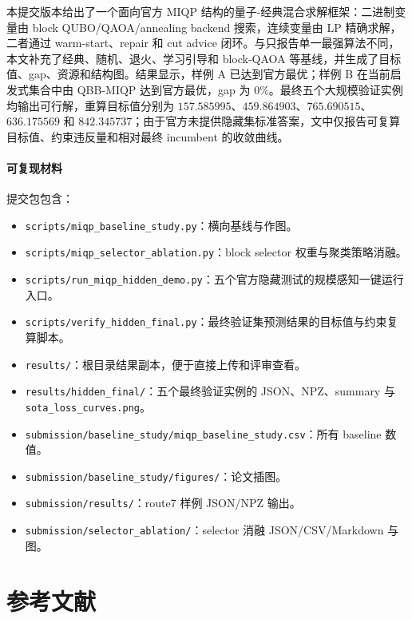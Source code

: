 \documentclass[UTF8,a4paper,11pt]{ctexart}
\begin{document}
本提交版本给出了一个面向官方 MIQP 结构的量子-经典混合求解框架：二进制变量由 block QUBO/QAOA/annealing backend 搜索，连续变量由 LP 精确求解，二者通过 warm-start、repair 和 cut advice 闭环。与只报告单一最强算法不同，本文补充了经典、随机、退火、学习引导和 block-QAOA 等基线，并生成了目标值、gap、资源和结构图。结果显示，样例 A 已达到官方最优；样例 B 在当前启发式集合中由 QBB-MIQP 达到官方最优，gap 为 $0\%$。最终五个大规模验证实例均输出可行解，重算目标值分别为 $157.585995$、$459.864903$、$765.690515$、$636.175569$ 和 $842.345737$；由于官方未提供隐藏集标准答案，文中仅报告可复算目标值、约束违反量和相对最终 incumbent 的收敛曲线。

\paragraph{可复现材料}
提交包包含：

\begin{itemize}
  \item \texttt{scripts/miqp\_baseline\_study.py}：横向基线与作图。
  \item \texttt{scripts/miqp\_selector\_ablation.py}：block selector 权重与聚类策略消融。
  \item \texttt{scripts/run\_miqp\_hidden\_demo.py}：五个官方隐藏测试的规模感知一键运行入口。
  \item \texttt{scripts/verify\_hidden\_final.py}：最终验证集预测结果的目标值与约束复算脚本。
  \item \texttt{results/}：根目录结果副本，便于直接上传和评审查看。
  \item \texttt{results/hidden\_final/}：五个最终验证实例的 JSON、NPZ、summary 与 \texttt{sota\_loss\_curves.png}。
  \item \texttt{submission/baseline\_study/miqp\_baseline\_study.csv}：所有 baseline 数值。
  \item \texttt{submission/baseline\_study/figures/}：论文插图。
  \item \texttt{submission/results/}：route7 样例 JSON/NPZ 输出。
  \item \texttt{submission/selector\_ablation/}：selector 消融 JSON/CSV/Markdown 与图。
\end{itemize}

\section{参考文献}
\end{document}
